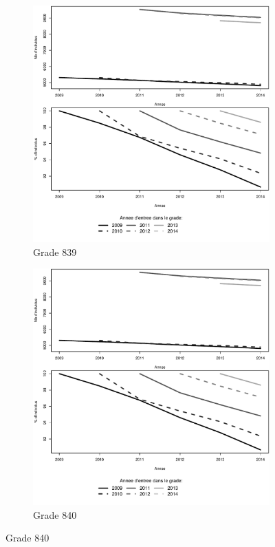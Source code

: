 \documentclass[11pt,a4paper]{article}
\begin{document}
\begin{figure}[ht] 
  \caption{Survie dans le grade: Aides soignants}
  \label{surv_by_entry} 
  \begin{subfigure}[b]{0.5\linewidth}
      \caption{Grade 839} 
    \label{echelon_by_neg_0} 
    \centering
    \includegraphics[width=1\linewidth]{AS_survival_839.pdf} 
  \end{subfigure}%
  \begin{subfigure}[b]{0.5\linewidth}
        \caption{Grade 840} 
    \label{echelon_by_neg_1} 
    \centering
    \includegraphics[width=1\linewidth]{AS_survival_840.pdf} 
  \end{subfigure} 
\end{figure}
\end{document}
